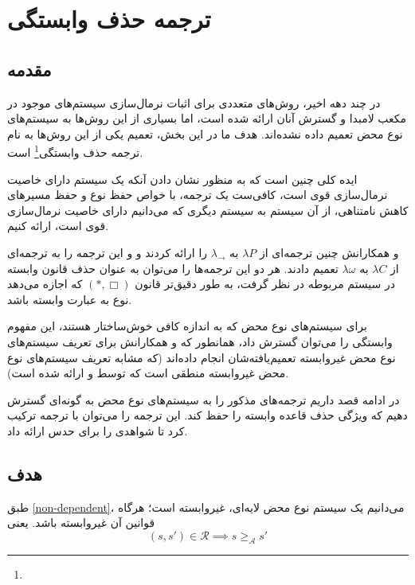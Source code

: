 \chapter{ترجمه حذف وابستگی}\label{S3}
\pagestyle{plain}

\section{مقدمه}

در چند دهه اخیر، روش‌های متعددی برای اثبات نرمال‌سازی سیستم‌های موجود در مکعب لامبدا و گسترش آنان ارائه شده است، اما بسیاری از این روش‌ها به سیستم‌های نوع محض تعمیم داده نشده‌اند. هدف ما در این بخش، تعمیم یکی از این روش‌ها به نام ترجمه‌ حذف وابستگی\footnote{} است.

ایده کلی چنین است که به منظور نشان دادن آنکه یک سیستم دارای خاصیت نرمال‌سازی قوی است، کافی‌ست یک ترجمه، با خواص حفظ نوع و حفظ مسیرهای کاهش نامتناهی، از آن سیستم به سیستم دیگری که می‌دانیم دارای خاصیت نرمال‌سازی قوی است، ارائه کنیم.

 و همکارانش
\cite{harper1993}
چنین ترجمه‌ای از
$\lambda P$ به $\lambda_\to$
را ارائه کردند و
 و  \cite{geuvers1991}
این ترجمه را به ترجمه‌ای از 
$\lambda C$ به $\lambda \omega$
تعمیم دادند. هر دو این ترجمه‌ها را می‌توان به عنوان حذف قانون وابسته در سیستم مربوطه در نظر گرفت، به طور دقیق‌تر قانون
$(*,\Box)$
که اجازه می‌دهد نوع به عبارت وابسته باشد.

برای سیستم‌های نوع محض که به اندازه کافی خوش‌ساختار هستند، این مفهوم وابستگی را می‌توان گسترش داد، همانطور که
 و همکارانش \cite{barthe2001}
برای تعریف سیستم‌های نوع محض غیروابسته تعمیم‌یافته‌شان انجام داده‌اند
(که مشابه تعریف سیستم‌های نوع محض غیروابسته منطقی است که توسط  و  \cite{coquand1994} ارائه شده است).

در ادامه قصد داریم ترجمه‌های مذکور را به سیستم‌های نوع محض به گونه‌ای گسترش دهیم که ویژگی حذف قاعده وابسته را حفظ کند. این ترجمه را می‌توان با ترجمه
\cite{barthe2001}
ترکیب کرد تا شواهدی را برای حدس
ارائه داد.

\section{هدف}
طبق
\ref{non-dependent}،
می‌دانیم یک سیستم نوع محض لایه‌ای، غیروابسته است؛ هرگاه قوانین آن غیروابسته باشد. یعنی
\begin{equation*}
(s,s') \in \mathcal{R} \implies s \ge_\mathcal{A} s'
\end{equation*}


